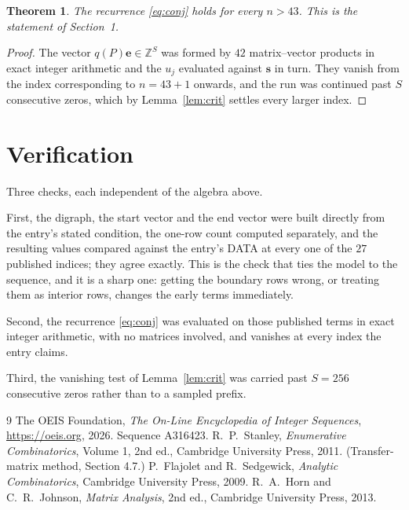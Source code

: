 \documentclass[11pt,a4paper]{article}
\theoremstyle{plain}
\newtheorem{theorem}{Theorem}
\theoremstyle{definition}
\begin{document}
\begin{theorem}
The recurrence \eqref{eq:conj} holds for every $n>43$. This is the statement of
Section~1.
\end{theorem}

\begin{proof}
The vector $q(P)\mathbf{e}\in\mathbb{Z}^{S}$ was formed by $42$ matrix--vector
products in exact integer arithmetic and the $u_j$ evaluated against $\mathbf{s}$ in turn.
They vanish from the index corresponding to $n=43+1$ onwards, and the run was continued
past $S$ consecutive zeros, which by Lemma~\ref{lem:crit} settles every larger index.
\end{proof}

\section{Verification}

Three checks, each independent of the algebra above.

First, the digraph, the start vector and the end vector were built directly from the
entry's stated condition, the one-row count computed separately, and the resulting values
compared against the entry's DATA at every one of the $27$ published indices; they
agree exactly. This is the check that ties the model to the sequence, and it is a sharp one:
getting the boundary rows wrong, or treating them as interior rows, changes the early terms
immediately.

Second, the recurrence \eqref{eq:conj} was evaluated on those published terms in exact
integer arithmetic, with no matrices involved, and vanishes at every index the entry claims.

Third, the vanishing test of Lemma~\ref{lem:crit} was carried past $S=256$ consecutive
zeros rather than to a sampled prefix.

\begin{thebibliography}{9}
 The OEIS Foundation, \emph{The On-Line Encyclopedia of Integer
Sequences}, \url{https://oeis.org}, 2026. Sequence A316423.
 R.~P.~Stanley, \emph{Enumerative Combinatorics}, Volume 1, 2nd ed.,
Cambridge University Press, 2011. (Transfer-matrix method, Section 4.7.)
 P.~Flajolet and R.~Sedgewick, \emph{Analytic Combinatorics}, Cambridge
University Press, 2009.
 R.~A.~Horn and C.~R.~Johnson, \emph{Matrix Analysis}, 2nd ed., Cambridge
University Press, 2013.
\end{thebibliography}
\end{document}
